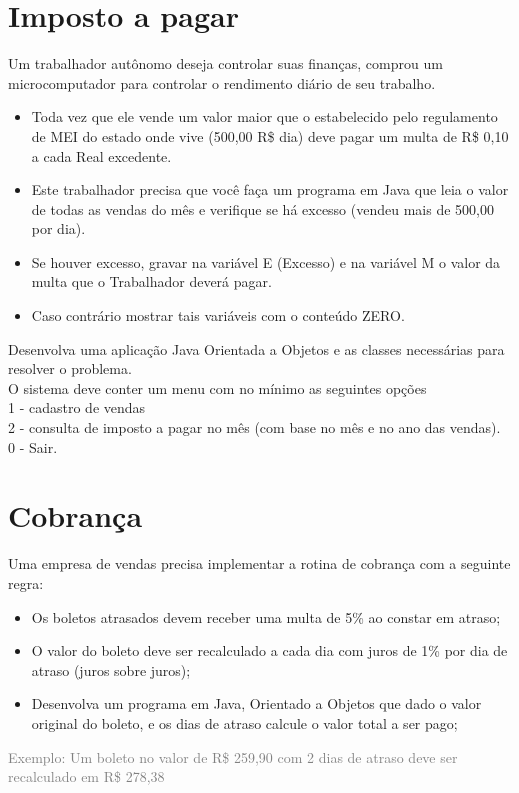 \documentclass[12pt,a4paper, brazil]{article}
\begin{document}
\section{Imposto a pagar}
\par
Um trabalhador autônomo deseja controlar suas finanças, comprou um microcomputador para controlar o rendimento diário de seu trabalho. 
\begin{itemize}
    \item Toda vez que ele vende um valor maior que o estabelecido pelo regulamento de MEI do estado onde vive (500,00 R\$ dia) deve pagar um multa de R\$ 0,10 a cada  Real excedente.
    \item Este trabalhador precisa que você faça um programa em Java que leia o valor de todas as vendas do mês e verifique se há excesso (vendeu mais de 500,00 por dia). 
    \item Se houver excesso, gravar na variável E (Excesso) e na variável M o valor da multa que o Trabalhador deverá pagar. 
    \item Caso contrário mostrar tais variáveis com o conteúdo ZERO.
\end{itemize} 
Desenvolva uma aplicação Java Orientada a Objetos e as classes necessárias para resolver o problema.\\
O sistema deve conter um menu com no mínimo as seguintes opções\\
1 - cadastro de vendas\\
2 - consulta de imposto a pagar no mês (com base no mês e no ano das vendas).\\
0 - Sair.
 \dotfill

 \section{Cobrança}

Uma empresa de vendas precisa implementar a rotina de cobrança com a seguinte regra:
\begin{itemize}
    \item Os boletos atrasados devem receber uma multa de 5\% ao constar em atraso;
    \item O valor do boleto deve ser recalculado a cada dia com juros de 1\% por dia de atraso (juros sobre juros);
    \item Desenvolva um programa em Java, Orientado a Objetos que dado o valor original do boleto, e os dias de atraso calcule o valor total a ser pago;
\end{itemize}
\textcolor{gray}{Exemplo: Um boleto no valor de R\$ 259,90 com 2 dias de atraso deve ser recalculado em R\$ 278,38 }
\end{document}
